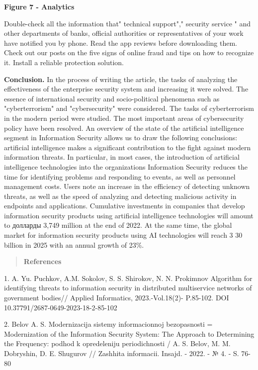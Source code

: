 {\bfseries Figure 7 - Analytics}

Double-check all the information that" technical support"," security
service " and other departments of banks, official authorities or
representatives of your work have notified you by phone. Read the app
reviews before downloading them. Check out our posts on the five signs
of online fraud and tips on how to recognize it. Install a reliable
protection solution.

{\bfseries Conclusion.} In the process of writing the article, the tasks of
analyzing the effectiveness of the enterprise security system and
increasing it were solved. The essence of international security and
socio-political phenomena such as "cyberterrorism" and "cybersecurity"
were considered. The tasks of cyberterrorism in the modern period were
studied. The most important areas of cybersecurity policy have been
resolved. An overview of the state of the artificial intelligence
segment in Information Security allows us to draw the following
conclusions: artificial intelligence makes a significant contribution to
the fight against modern information threats. In particular, in most
cases, the introduction of artificial intelligence technologies into the
organization\textquotesingle s Information Security reduces the time for
identifying problems and responding to events, as well as personnel
management costs. Users note an increase in the efficiency of detecting
unknown threats, as well as the speed of analyzing and detecting
malicious activity in endpoints and applications. Cumulative investments
in companies that develop information security products using artificial
intelligence technologies will amount to долларды 3,749 million at the
end of 2022. At the same time, the global market for information
security products using AI technologies will reach 3 30 billion in 2025
with an annual growth of 23\%.

\begin{quote}
{\bfseries References}
\end{quote}

1. A. Yu. Puchkov, A.M. Sokolov, S. S. Shirokov, N. N. Prokimnov
Algorithm for identifying threats to information security in distributed
multiservice networks of government bodies// Applied Informatics,
2023.-Vol.18(2)- P.85-102. DOI 10.37791/2687-0649-2023-18-2-85-102

2. Belov A. S. Modernizacija sistemy informacionnoj bezopasnosti =
Modernization of the Information Security System: The Approach to
Determining the Frequency: podhod k opredeleniju periodichnosti / A. S.
Belov, M. M. Dobryshin, D. E. Shugurov // Zashhita informacii. Insajd. -
2022. - № 4. - S. 76-80

